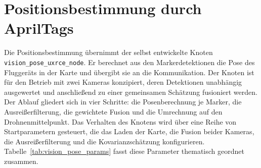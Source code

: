\section{Positionsbestimmung durch AprilTags}
\label{sec:pos_positionsbestimmung}
Die Positionsbestimmung übernimmt der selbst entwickelte Knoten \texttt{vision\_pose\_uxrce\_node}.
Er berechnet aus den Markerdetektionen die Pose des Fluggeräts in der Karte und übergibt sie an die Kommunikation.
Der Knoten ist für den Betrieb mit zwei Kameras konzipiert, deren Detektionen unabhängig ausgewertet und anschließend zu einer 
gemeinsamen Schätzung fusioniert werden.
Der Ablauf gliedert sich in vier Schritte: die Posenberechnung je Marker, die Ausreißerfilterung, die gewichtete Fusion
und die Umrechnung auf den Drohnenmittelpunkt.
Das Verhalten des Knotens wird über eine Reihe von Startparametern gesteuert, die das Laden der Karte, die Fusion beider Kameras,
die Ausreißerfilterung und die Kovarianzschätzung konfigurieren.
Tabelle~\ref{tab:vision_pose_params} fasst diese Parameter thematisch geordnet zusammen.

